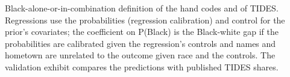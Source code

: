 {Black-alone-or-in-combination definition of the hand codes and of TIDES. Regressions use the probabilities (regression calibration) and control for the prior's covariates; the coefficient on P(Black) is the Black-white gap if the probabilities are calibrated given the regression's controls and names and hometown are unrelated to the outcome given race and the controls. The validation exhibit compares the predictions with published TIDES shares.
\par}

